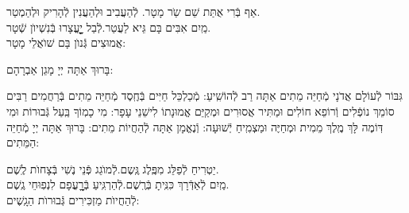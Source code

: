 \documentclass[twoside, openany, parskip=half, 11pt]{book}
\begin{document}


אַף בְּֿרִי אֻתַּת שֵׁם שַֹר מָטָר. \hfill לְֿהַעֲבִיב וּלְהַעֲנִין לְֿהָרִיק וּלְהַמְטַר.\\
מַֽיִם אִבִּים בָּם גֵּיא לַעֲטַר.\hfill לְֿבַל יׇׇׇׇׇׇָעֳצָרוּ בְּֿנִשְׁיוׂן שְֿׁטָר.\\
אֲמוּצִים גְּֿנוׂן בָּם שׁוׂאֲלֵי מָטָר:



בָּרוּךְ אַתָּה יְיָ מָגֵן אַבְרָהָם:

גִּבּוֹר לְֿעוֹלָם אֲדֹנָי מְֿחַיֵּה מֵתִים אַתָּה רַב לְֿהוֹשִֽׁיעַ: מְֿכַלְכֵּל חַיִּים בְּֿחֶֽסֶד מְֿחַיֵּה מֵתִים בְּֿרַחֲמִים רַבִּים סוֹמֵךְ נוֹפְֿלִים וְֿרוֹפֵא חוֹלִים וּמַתִּיר אֲסוּרִים וּמְקַיֵּם אֱמוּנָתוֹ לִישֵׁנֵי עָפָר: מִי כָמֽוֹךָ בַּֽעַל גְּֿבוּרוֹת וּמִי דּֽוֹמֶה לָּךְ מֶֽלֶךְ מֵמִית וּמְחַיֶּה וּמַצְמִֽיחַ יְֿשׁוּעָה: וְֿנֶאֱמָן אַתָּה לְֿהַחֲיוֹת מֵתִים: בָּרוּךְ אַתָּה יְיָ מְֿחַיֵּה הַמֵּתִים:





יַטְרִיחַ לְֿפַלֵּג מִפֶּֽלֶג גֶּֽשֶם.\hfill לְֿמוׂגֵג פְּֿנֵי נֶשִׁי בְּֿצָחוׂת לֶֽשֶׁם.\\
מַֽיִם לְֿאַדְּֿרָךְ כִּנִּֽיתָ בְּֿרֶֽשֶׁם.\hfill לְֿהַרְגִּֽיעַ בְּֿרׇׇׇׇָעֳפָם לִנְפֽוּחֵי גֶֽשֶׁם.\\
לְֿהַחֲיוׂת מַזְכִּירִים גְּֿבוּרוׂת הַגָֽשֶׁים:
\end{document}
